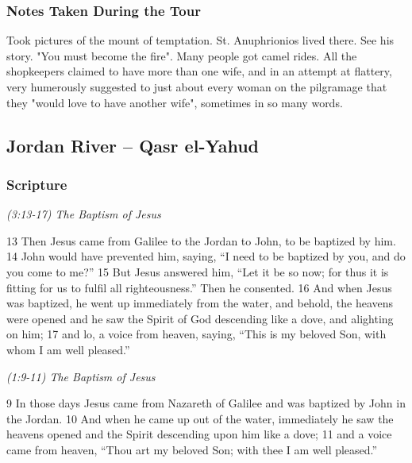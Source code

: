 \documentclass[letterpaper]{report}
\begin{document}
\subsubsection{Notes Taken During the Tour}
Took pictures of the mount of temptation.
St. Anuphrionios lived there. See his story. "You must become the fire".
Many people got camel rides.
All the shopkeepers claimed to have more than one wife,
and in an attempt at flattery, very humerously suggested to just about every woman on the pilgramage that
they "would love to have another wife",
sometimes in so many words. 



\clearpage
\subsection{Jordan River -- Qasr el-Yahud}
\begin{multicols}{2}
	\mbox{}
\end{multicols}
\subsubsection{Scripture}

{\centering
	\emph{(3:13-17) The Baptism of Jesus}\\
}
\begin{multicols}{2}
13 Then Jesus came from Galilee to the Jordan to John, to be baptized by him. 14 John would have prevented him, saying, “I need to be baptized by you, and do you come to me?” 15 But Jesus answered him, “Let it be so now; for thus it is fitting for us to fulfil all righteousness.” Then he consented. 16 And when Jesus was baptized, he went up immediately from the water, and behold, the heavens were opened and he saw the Spirit of God descending like a dove, and alighting on him; 17 and lo, a voice from heaven, saying, “This is my beloved Son, with whom I am well pleased.”
\end{multicols}

{\centering
	\emph{(1:9-11) The Baptism of Jesus}\\
}
\begin{multicols}{2}
9 In those days Jesus came from Nazareth of Galilee and was baptized by John in the Jordan. 10 And when he came up out of the water, immediately he saw the heavens opened and the Spirit descending upon him like a dove; 11 and a voice came from heaven, “Thou art my beloved Son; with thee I am well pleased.”
\end{multicols}
\end{document}
